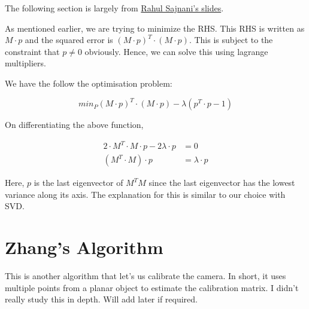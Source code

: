 The following section is largely from \href{https://github.com/RoboticsIIITH/summer-sessions-2020/blob/master/lecture-slides/Multiple\%20View\%20Geometry/lecture-1/MVG_Session_1.pdf}{Rahul Sajnani's slides}.

As mentioned earlier, we are trying to minimize the RHS. This RHS is written as $M\cdot p$ and the squared error is $(M\cdot p)^T\cdot(M\cdot p)$. This is subject to the constraint that $p\neq0$ obviously. Hence, we can solve this using lagrange multipliers.

We have the follow the optimisation problem:

\begin{equation}
    min_P(M\cdot p)^T\cdot(M\cdot p) - \lambda (p^T \cdot p -1)
\end{equation}

On differentiating the above function,

\begin{equation}
\begin{split}
    2\cdot M^T\cdot M\cdot p - 2\lambda\cdot p &= 0 \\
    (M^T\cdot M)\cdot p &= \lambda \cdot p
\end{split}
\end{equation}

Here, $p$ is the last eigenvector of $M^TM$ since the last eigenvector has the lowest variance along its axis. The explanation for this is similar to our choice with SVD.

\section{Zhang's Algorithm}

This is another algorithm that let's us calibrate the camera. In short, it uses multiple points from a planar object to estimate the calibration matrix. I didn't really study this in depth. Will add later if required.